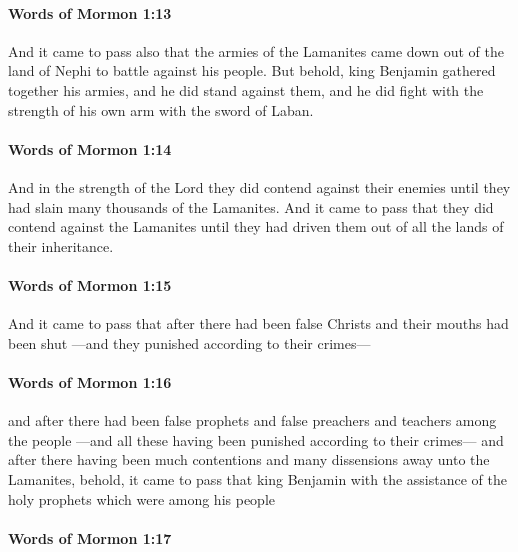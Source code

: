 		\paragraph{Words of Mormon 1:13} %
			\label{WORDSOFMORMON-1-13}

			And it came to pass also that the armies of the Lamanites came down
			out of the land of Nephi to battle against his people.
			But behold, king Benjamin gathered together his armies,
			and he did stand against them,
			and he did fight with the strength of his own arm with the sword of Laban.

		\paragraph{Words of Mormon 1:14} %
			\label{WORDSOFMORMON-1-14}

			And in the strength of the Lord they did contend against their enemies
			until they had slain many thousands of the Lamanites.
			And it came to pass that they did contend against the Lamanites
			until they had driven them out of all the lands of their inheritance.

		\paragraph{Words of Mormon 1:15} %
			\label{WORDSOFMORMON-1-15}

			And it came to pass that after there had been false Christs
			and their mouths had been shut
			---and they punished according to their crimes---

		\paragraph{Words of Mormon 1:16} %
			\label{WORDSOFMORMON-1-16}

			and after there had been false prophets
			and false preachers and teachers among the people
			---and all these having been punished according to their crimes---
			and after there having been much contentions
			and many dissensions away unto the Lamanites,
			behold, it came to pass that king Benjamin
			with the assistance of the holy prophets which were among his people

		\paragraph{Words of Mormon 1:17} %
			\label{WORDSOFMORMON-1-17}

